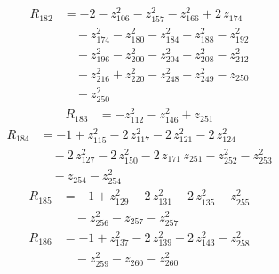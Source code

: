 \begin{equation*}\begin{aligned}
R_{182}&=-2 -z_{106}^{2} -z_{157}^{2} -z_{166}^{2} +2\,z_{174} \\
&\quad -z_{174}^{2} -z_{180}^{2} -z_{184}^{2} -z_{188}^{2} -z_{192}^{2} \\
&\quad -z_{196}^{2} -z_{200}^{2} -z_{204}^{2} -z_{208}^{2} -z_{212}^{2} \\
&\quad -z_{216}^{2} +z_{220}^{2} -z_{248}^{2} -z_{249}^{2} -z_{250} \\
&\quad -z_{250}^{2}
\end{aligned}\end{equation*}
\begin{equation*}\begin{aligned}
R_{183}&=-z_{112}^{2} -z_{146}^{2} +z_{251}
\end{aligned}\end{equation*}
\begin{equation*}\begin{aligned}
R_{184}&=-1 +z_{115}^{2} -2\,z_{117}^{2} -2\,z_{121}^{2} -2\,z_{124}^{2} \\
&\quad -2\,z_{127}^{2} -2\,z_{150}^{2} -2\,z_{171}\,z_{251} -z_{252}^{2} -z_{253}^{2} \\
&\quad -z_{254} -z_{254}^{2}
\end{aligned}\end{equation*}
\begin{equation*}\begin{aligned}
R_{185}&=-1 +z_{129}^{2} -2\,z_{131}^{2} -2\,z_{135}^{2} -z_{255}^{2} \\
&\quad -z_{256}^{2} -z_{257} -z_{257}^{2}
\end{aligned}\end{equation*}
\begin{equation*}\begin{aligned}
R_{186}&=-1 +z_{137}^{2} -2\,z_{139}^{2} -2\,z_{143}^{2} -z_{258}^{2} \\
&\quad -z_{259}^{2} -z_{260} -z_{260}^{2}
\end{aligned}\end{equation*}
